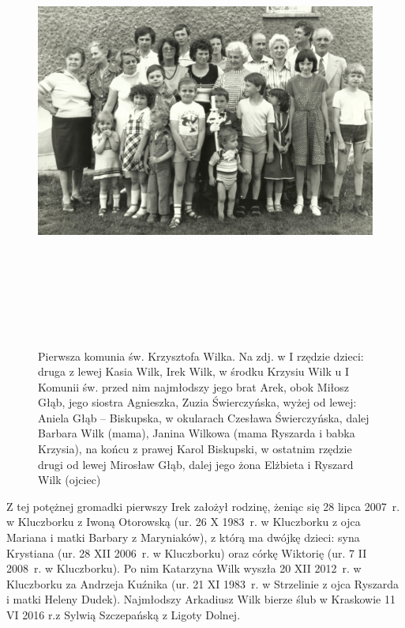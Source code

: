\begin{figure}
\begin{center}
\includegraphics[height=150mm]{zdjecia/komunia_krzysztofa_wilka.jpg}
\caption[Pierwsza komunia św. Krzysztofa Wilka]{Pierwsza komunia św. Krzysztofa Wilka. Na zdj. w I rzędzie dzieci: druga z lewej Kasia Wilk, Irek Wilk, w środku Krzysiu Wilk u I Komunii św. przed nim najmłodszy jego brat Arek, obok Miłosz Głąb, jego siostra Agnieszka, Zuzia Świerczyńska, wyżej od lewej: Aniela Głąb -- Biskupska, w okularach Czesława Świerczyńska, dalej Barbara Wilk (mama), Janina Wilkowa (mama Ryszarda i babka Krzysia), na końcu z prawej Karol Biskupski, w ostatnim rzędzie drugi od lewej Mirosław Głąb, dalej jego żona Elżbieta i Ryszard Wilk (ojciec)}
\label{rys:komunia_krzysztofa_wilka}
\end{center}
\end{figure}


Z tej potężnej gromadki pierwszy Irek założył rodzinę, żeniąc się 28 lipca 2007~r. w Kluczborku z Iwoną Otorowską (ur. 26 X 1983~r. w Kluczborku z ojca Mariana i matki Barbary z Maryniaków), z którą ma dwójkę dzieci: syna Krystiana (ur. 28 XII 2006~r. w Kluczborku) oraz córkę Wiktorię (ur. 7 II 2008~r. w Kluczborku). Po nim Katarzyna Wilk wyszła 20 XII 2012~r. w Kluczborku za Andrzeja Kuźnika (ur. 21 XI 1983~r. w Strzelinie z ojca Ryszarda i matki Heleny Dudek). Najmłodszy Arkadiusz Wilk bierze ślub w Kraskowie 11 VI 2016 r.z Sylwią Szczepańską z Ligoty Dolnej.





